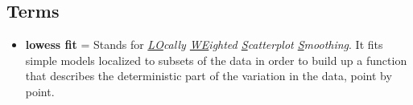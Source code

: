 \subsection{Terms}

\begin{itemize}
    \item \textbf{lowess fit} = Stands for \textit{\underline{LO}cally \underline{WE}ighted \underline{S}catterplot \underline{S}moothing}.
    It fits simple models localized to subsets of the data in order to build up a function that describes the deterministic part of the variation in the data, point by point.
\end{itemize} 